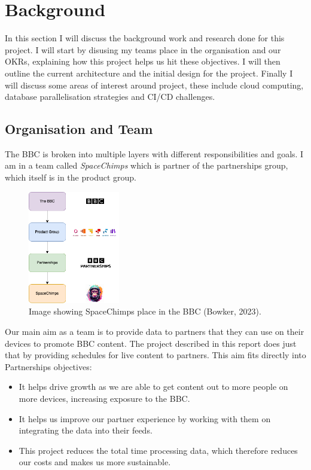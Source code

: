 \section{Background}
  In this section I will discuss the background work and research done for this project. I will start by disusing my teams place in the organisation and 
  our OKRs, explaining how this project helps us hit these objectives. I will then outline the current architecture and the initial design for the project.
  Finally I will discuss some areas of interest around project, these include cloud computing, database parallelisation strategies and CI/CD challenges.

  \subsection{Organisation and Team}
  The BBC is broken into multiple layers with different responsibilities and goals. I am in a team called \textit{SpaceChimps} which is partner of
  the partnerships group, which itself is in the product group.

  \begin{figure}[H]
    \centering
    \includegraphics[width=4cm]{assets/bbcHierarchy.drawio.png}
    \caption{Image showing SpaceChimps place in the BBC (Bowker, 2023).}
    \label{fig:bbcHierarchy}
  \end{figure}

  Our main aim as a team is to provide data to partners that they can use on their devices to promote BBC content. The project described in this report does
  just that by providing schedules for live content to partners. This aim fits directly into Partnerships objectives:

  \begin{itemize}
    \item It helps drive growth as we are able to get content out to more people on more devices, increasing exposure to the BBC.
    \item It helps us improve our partner experience by working with them on integrating the data into their feeds.
    \item This project reduces the total time processing data, which therefore reduces our costs and makes us more sustainable.
  \end{itemize}

